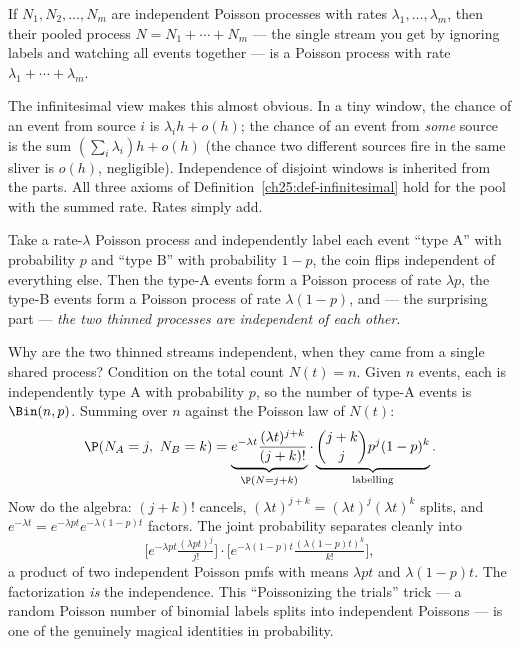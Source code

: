 \begin{theorem}[Superposition]
\label{ch25:thm-superposition}
If $N_1, N_2, \dots, N_m$ are independent Poisson processes with rates
$\lambda_1, \dots, \lambda_m$, then their pooled process $N = N_1 + \cdots + N_m$
--- the single stream you get by ignoring labels and watching all events together
--- is a Poisson process with rate $\lambda_1 + \cdots + \lambda_m$.
\end{theorem}

The infinitesimal view makes this almost obvious. In a tiny window, the chance of
an event from source $i$ is $\lambda_i h + o(h)$; the chance of an event from
\emph{some} source is the sum $(\sum_i \lambda_i)h + o(h)$ (the chance two
different sources fire in the same sliver is $o(h)$, negligible). Independence of
disjoint windows is inherited from the parts. All three axioms of
Definition~\ref{ch25:def-infinitesimal} hold for the pool with the summed rate.
Rates simply add.

\begin{theorem}[Thinning]
\label{ch25:thm-thinning}
Take a rate-$\lambda$ Poisson process and independently label each event ``type
A'' with probability $p$ and ``type B'' with probability $1-p$, the coin flips
independent of everything else. Then the type-A events form a Poisson process of
rate $\lambda p$, the type-B events form a Poisson process of rate
$\lambda(1-p)$, and --- the surprising part --- \emph{the two thinned processes
are independent of each other}.
\end{theorem}

\begin{whybox}
Why are the two thinned streams independent, when they came from a single shared
process? Condition on the total count $N(t)=n$. Given $n$ events, each is
independently type A with probability $p$, so the number of type-A events is
$\Bin(n,p)$. Summing over $n$ against the Poisson law of $N(t)$:
\[
\P(N_A = j,\ N_B = k)
= \underbrace{e^{-\lambda t}\frac{(\lambda t)^{j+k}}{(j+k)!}}_{\P(N=j+k)}\cdot
\underbrace{\binom{j+k}{j}p^j(1-p)^k}_{\text{labelling}}.
\]
Now do the algebra: $(j+k)!$ cancels, $(\lambda t)^{j+k}=(\lambda t)^j(\lambda
t)^k$ splits, and $e^{-\lambda t}=e^{-\lambda p t}e^{-\lambda(1-p)t}$ factors. The
joint probability separates cleanly into
\[
\Big[e^{-\lambda p t}\tfrac{(\lambda p t)^j}{j!}\Big]
\cdot
\Big[e^{-\lambda (1-p) t}\tfrac{(\lambda (1-p) t)^k}{k!}\Big],
\]
a product of two independent Poisson pmfs with means $\lambda p t$ and
$\lambda(1-p)t$. The factorization \emph{is} the independence. This ``Poissonizing
the trials'' trick --- a random Poisson number of binomial labels splits into
independent Poissons --- is one of the genuinely magical identities in
probability.
\end{whybox}

